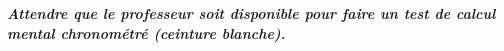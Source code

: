 \exo{}

\begin{center}
	\textbf{\textit{Attendre que le professeur soit disponible pour faire un test de calcul mental chronométré (ceinture blanche).}}
 	
\end{center}